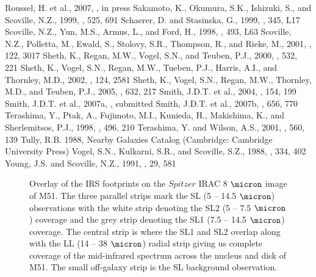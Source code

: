 \documentclass[12pt,preprint]{aastex}
\begin{document}
\begin{thebibliography}{}
 Roussel, H. et al., 2007, \apjs, in press
 Sakamoto, K., Okumura, S.K., Ishizuki, S., and Scoville, N.Z., 1999, \apj, 525, 691
 Schaerer, D. and Stasinska, G., 1999, \aap, 345, L17
 Scoville, N.Z., Yun, M.S., Armus, L., and Ford, H., 1998, \apj, 493, L63 
 Scoville, N.Z., Polletta, M., Ewald, S., Stolovy, S.R., Thompson, R., and Rieke, M., 2001, \aj, 122, 3017
 Sheth, K., Regan, M.W., Vogel, S.N., and Teuben, P.J., 2000, \apj, 532, 221 
 Sheth, K., Vogel, S.N., Regan, M.W., Tueben, P.J., Harris, A.I., and Thornley, M.D., 2002, \aj, 124, 2581
 Sheth, K., Vogel, S.N., Regan, M.W., Thornley, M.D., and Teuben, P.J., 2005, \apj, 632, 217
 Smith, J.D.T. et al., 2004, \apjs, 154, 199
 Smith, J.D.T. et al., 2007a, \pasp, submitted
 Smith, J.D.T. et al., 2007b, \apj, 656, 770
 Terashima, Y., Ptak, A., Fujimoto, M.I., Kunieda, H., Makishima, K., and Sherlemitsos, P.J., 1998, \apj, 496, 210
 Terashima, Y. and Wilson, A.S., 2001, \apj, 560, 139
 Tully, R.B. 1988, Nearby Galaxies Catalog (Cambridge: Cambridge University Press)
 Vogel, S.N., Kulkarni, S.R., and Scoville, S.Z., 1988, \nat, 334, 402
 Young, J.S. and Scoville, N.Z., 1991, \araa, 29, 581
\end{thebibliography}

\clearpage

\begin{figure}
\caption{Overlay of the IRS footprints on the $Spitzer$ IRAC 8 $\micron$ image of M51.  
The three parallel strips mark the SL (5 -- 14.5 $\micron$) observations with the white 
strip denoting the SL2 (5 -- 7.5 $\micron$) coverage and the grey strip 
denoting the SL1 (7.5 -- 14.5 $\micron$) coverage.  The central strip is where the SL1
and SL2 overlap along with the LL (14 -- 38 $\micron$) radial strip giving us complete coverage of the 
mid-infrared spectrum across the nucleus and disk of M51.  
The small off-galaxy strip is the SL background observation.}
\label{figure-1}
\end{figure}
\end{document}
